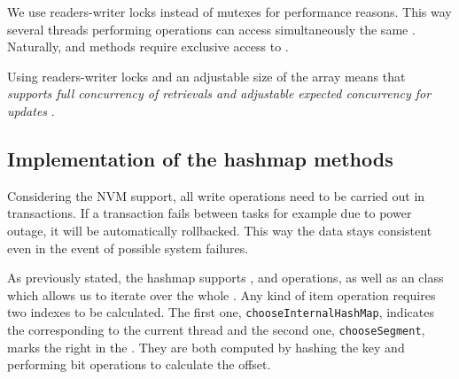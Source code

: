     We use readers-writer locks instead of mutexes for performance reasons. 
    This way several threads performing \getMethod operations can access simultaneously the same \internalHashMap. 
    Naturally, \insertMethod and \removeMethod methods require exclusive access to \internalHashMap.
            
    Using readers-writer locks and an adjustable size of the \internalHashMaps array means that \PHT \emph{supports full concurrency of retrievals and adjustable expected concurrency for updates} \cite{ConcurrentHashMapJava}. 

\subsection{Implementation of the hashmap methods}


    Considering the NVM support, all write operations need to be carried out in transactions. 
    If a transaction fails between tasks for example due to power outage, it will be automatically rollbacked.
    This way the data stays consistent even in the event of possible system failures.
    
    As previously stated, the hashmap supports \insertMethod, \getMethod and \removeMethod operations, as well as an \Iterator class which allows us to iterate over the whole \NvmHashMap.
    Any kind of item operation requires two indexes to be calculated. 
    The first one, \texttt{chooseInternalHashMap}, indicates the \internalHashMap corresponding to the current thread and the second one, \texttt{chooseSegment}, marks the right \Segment in the \internalHashMap. 
    They are both computed by hashing the key and performing bit operations to calculate the offset.
    

